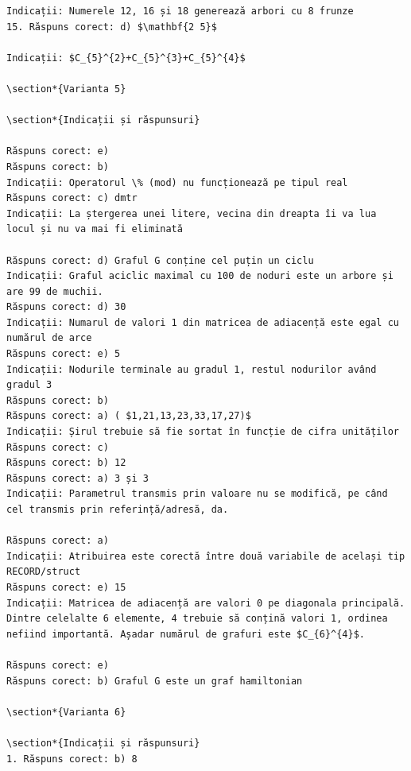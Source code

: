 \documentclass[10pt]{article}
\begin{document}
\begin{verbatim}
Indicații: Numerele 12, 16 și 18 generează arbori cu 8 frunze
15. Răspuns corect: d) $\mathbf{2 5}$

Indicații: $C_{5}^{2}+C_{5}^{3}+C_{5}^{4}$

\section*{Varianta 5}

\section*{Indicații și răspunsuri}

Răspuns corect: e)
Răspuns corect: b)
Indicații: Operatorul \% (mod) nu funcționează pe tipul real
Răspuns corect: c) dmtr
Indicații: La ștergerea unei litere, vecina din dreapta îi va lua locul și nu va mai fi eliminată

Răspuns corect: d) Graful G conține cel puțin un ciclu
Indicații: Graful aciclic maximal cu 100 de noduri este un arbore și are 99 de muchii.
Răspuns corect: d) 30
Indicații: Numarul de valori 1 din matricea de adiacență este egal cu numărul de arce
Răspuns corect: e) 5
Indicații: Nodurile terminale au gradul 1, restul nodurilor având gradul 3
Răspuns corect: b)
Răspuns corect: a) ( $1,21,13,23,33,17,27)$
Indicații: Șirul trebuie să fie sortat în funcție de cifra unităților
Răspuns corect: c)
Răspuns corect: b) 12
Răspuns corect: a) 3 și 3
Indicații: Parametrul transmis prin valoare nu se modifică, pe când cel transmis prin referință/adresă, da.

Răspuns corect: a)
Indicații: Atribuirea este corectă între două variabile de același tip RECORD/struct
Răspuns corect: e) 15
Indicații: Matricea de adiacență are valori 0 pe diagonala principală. Dintre celelalte 6 elemente, 4 trebuie să conțină valori 1, ordinea nefiind importantă. Așadar numărul de grafuri este $C_{6}^{4}$.

Răspuns corect: e)
Răspuns corect: b) Graful G este un graf hamiltonian

\section*{Varianta 6}

\section*{Indicații și răspunsuri}
1. Răspuns corect: b) 8


\end{verbatim}
\end{document}
